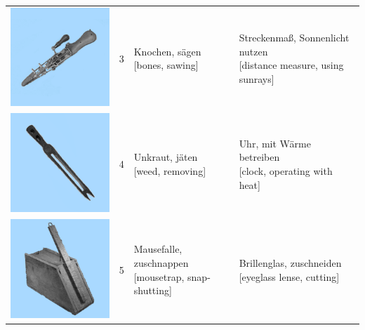 \documentclass[
  english,
  doc,12pt,twoside,floatsintext]{apa7}
\begin{document}
\begin{center}
\begin{ThreePartTable}
{\begin{longtable}{llll}
\includegraphics[valign=c, scale=0.23]{../materials/unfamiliar/3.png} & 3 & \makecell[l]{Knochen, sägen\\{[bones, sawing]}} & \makecell[l]{Streckenmaß, Sonnenlicht nutzen\\{[distance measure, using sunrays]}}\\
\includegraphics[valign=c, scale=0.23]{../materials/unfamiliar/4.png} & 4 & \makecell[l]{Unkraut, jäten\\{[weed, removing]}} & \makecell[l]{Uhr, mit Wärme betreiben\\{[clock, operating with heat]}}\\
\includegraphics[valign=c, scale=0.23]{../materials/unfamiliar/5.png} & 5 & \makecell[l]{Mausefalle, zuschnappen\\{[mousetrap, snap-shutting]}} & \makecell[l]{Brillenglas, zuschneiden\\{[eyeglass lense, cutting]}}\\

\end{longtable}}
\end{ThreePartTable}
\end{center}
\end{document}
